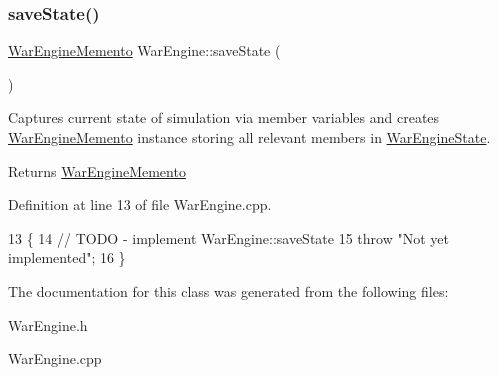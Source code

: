 \subsubsection{\texorpdfstring{save\+State()}{saveState()}}
{\footnotesize\ttfamily \hyperlink{classWarEngineMemento}{War\+Engine\+Memento} War\+Engine\+::save\+State (\begin{DoxyParamCaption}{ }\end{DoxyParamCaption})}



Captures current state of simulation via member variables and creates \hyperlink{classWarEngineMemento}{War\+Engine\+Memento} instance storing all relevant members in \hyperlink{classWarEngineState}{War\+Engine\+State}. 

\begin{DoxyReturn}{Returns}
\hyperlink{classWarEngineMemento}{War\+Engine\+Memento} 
\end{DoxyReturn}


Definition at line 13 of file War\+Engine.\+cpp.


\begin{DoxyCode}
13                                       \{
14     \textcolor{comment}{// TODO - implement WarEngine::saveState}
15     \textcolor{keywordflow}{throw} \textcolor{stringliteral}{"Not yet implemented"};
16 \}
\end{DoxyCode}


The documentation for this class was generated from the following files\+:\begin{DoxyCompactItemize}
\item 
War\+Engine.\+h\item 
War\+Engine.\+cpp\end{DoxyCompactItemize}
